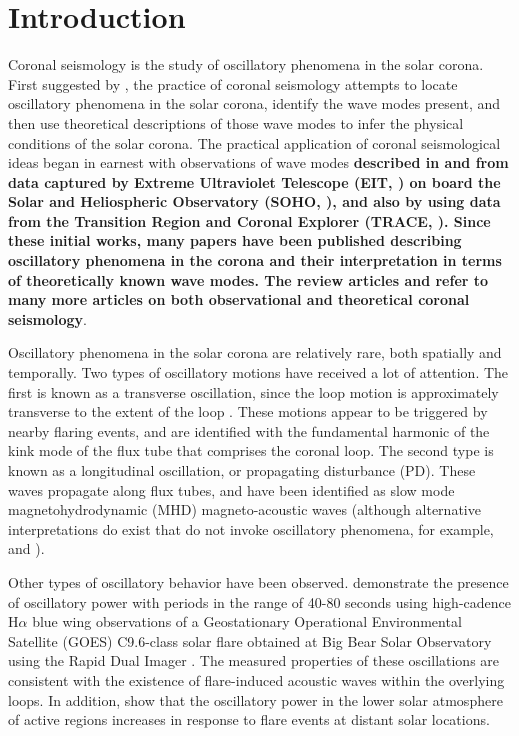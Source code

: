 \documentclass[referee]{aastex}
\begin{document}
\section{Introduction}\label{sec:int}
Coronal seismology is the study of oscillatory phenomena in the solar
corona.  First suggested by \cite{1970PASJ...22..341U}, the practice
of coronal seismology attempts to locate oscillatory phenomena in the
solar corona, identify the wave modes present, and then use
theoretical descriptions of those wave modes to infer the physical
conditions of the solar corona.  The practical application of coronal
seismological ideas began in earnest with observations of wave modes
{\bf described in \cite{1998ApJ...501L.217D} and
  \cite{1999SoPh..186..207B} from data captured by Extreme Ultraviolet
  Telescope (EIT, \citealp{1995SoPh..162..291D}) on board the Solar and Heliospheric
  Observatory (SOHO, \citealp{1995SoPh..162....1D}), and also by
  \citep{1999ApJ...520..880A} using data from the Transition Region
  and Coronal Explorer (TRACE, \citealp{1999SoPh..187..229H}).  Since these initial works,
  many papers have been published describing oscillatory phenomena in
  the corona and their interpretation in terms of theoretically known
  wave modes.  The review articles \cite{lrsp-2005-3} and
  \cite{2012RSPTA.370.3193D} refer to many more articles on both
  observational and theoretical coronal seismology}.

Oscillatory phenomena in the solar corona are relatively rare, both
spatially and temporally.  Two types of oscillatory motions have
received a lot of attention.  The first is known as a transverse
oscillation, since the loop motion is approximately transverse to the
extent of the loop \citep{1999Sci...285..862N}.  These motions appear
to be triggered by nearby flaring events, and are identified with the
fundamental harmonic of the kink mode of the flux tube that comprises
the coronal loop.  The second type is known as a longitudinal
oscillation, or propagating disturbance (PD).  These waves propagate
along flux tubes, and have been identified as slow mode
magnetohydrodynamic (MHD) magneto-acoustic waves (although alternative
interpretations do exist that do not invoke oscillatory phenomena, for
example, \citealp*{0004-637X-722-2-1013} and
\citealp*{2041-8205-727-2-L37}).  

Other types of oscillatory behavior have been observed.
\cite{2005ApJ...620.1101M} demonstrate the presence of oscillatory
power with periods in the range of 40-80 seconds using high-cadence
H$\alpha$ blue wing observations of a Geostationary Operational
Environmental Satellite (GOES) C9.6-class solar flare obtained at Big
Bear Solar Observatory using the Rapid Dual Imager
\citep{2000SoPh..193..259P, 2007A&A...473..943J}. The measured
properties of these oscillations are consistent with the existence of
flare-induced acoustic waves within the overlying loops.  In addition,
\cite{2013ApJ...772...54A} show that the oscillatory power in the
lower solar atmosphere of active regions increases in response to
flare events at distant solar locations.
\end{document}

